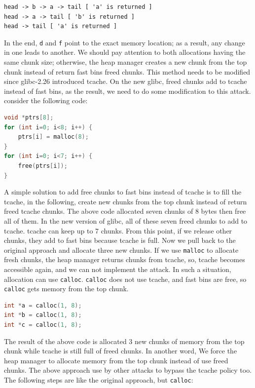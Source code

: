 \documentclass{masterthesis}
\newcommand*\libc{glibc}
\newcommand*\tch{tcache}
\newcommand*\fb{fast bins}
\newcommand*\mallocc{\lstinline{malloc}}
\newcommand*\callocc{\lstinline{calloc}}
\begin{document}
\begin{lstlisting}[frame=tlrb]
head -> b -> a -> tail [ 'a' is returned ]
head -> a -> tail [ 'b' is returned ]
head -> tail [ 'a' is returned ]
\end{lstlisting}

In the end, \lstinline{d} and \lstinline{f} point to the exact memory location; as a result, any change in one leads to another. We should pay attention to both allocations having the same chunk size; otherwise, the heap manager creates a new chunk from the top chunk instead of return \fb{} freed chunks.
This method needs to be modified since \libc{-2.26} introduced \tch{}. On the new \libc{}, freed chunks add to \tch{} instead of \fb{}, as the result, we need to do some modification to this attack. consider the following code:

\begin{lstlisting}[language=c,frame=tlrb]
void *ptrs[8];
for (int i=0; i<8; i++) {
	ptrs[i] = malloc(8);
}
for (int i=0; i<7; i++) {
	free(ptrs[i]);
}
\end{lstlisting}

A simple solution to add free chunks to \fb{} instead of \tch{} is to fill the \tch{}, in the following, create new chunks from the top chunk instead of return freed \tch{} chunks. The above code allocated seven chunks of 8 bytes then free all of them. In the new version of \libc{}, all of these seven freed chunks to add to \tch{}. \tch{} can keep up to 7 chunks. From this point, if we release other chunks, they add to \fb{} because \tch{} is full. Now we pull back to the original approach and allocate three new chunks. If we use \mallocc{} to allocate fresh chunks, the heap manager returns chunks from \tch{}, so, \tch{} becomes accessible again, and we can not implement the attack. In such a situation, allocation can use \callocc{}. \callocc{} does not use \tch{}, and \fb{} are free, so \callocc{} gets memory from the top chunk.

\begin{lstlisting}[language=c,frame=tlrb]
int *a = calloc(1, 8);
int *b = calloc(1, 8);
int *c = calloc(1, 8);
\end{lstlisting}

The result of the above code is allocated 3 new chunks of memory from the top chunk while \tch{} is still full of freed chunks. In another word, We force the heap manager to allocate memory from the top chunk instead of use freed chunks. The above approach use by other attacks to bypass the \tch{} policy too. The following steps are like the original approach, but \callocc{}:
\end{document}
